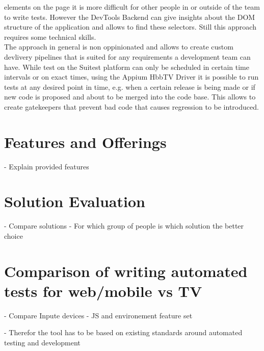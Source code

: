elements on the page it is more difficult for other people in or outside of the team to write tests. However the
DevTools Backend can give insights about the DOM structure of the application and allows to find these selectors.
Still this approach requires some technical skills.\\
The approach in general is non oppinionated and allows to create custom devlivery pipelines that is suited for any
requirements a development team can have. While test on the Suitest platform can only be scheduled in certain time
intervals or on exact times, using the Appium HbbTV Driver it is possible to run tests at any desired point in time,
e.g. when a certain release is being made or if new code is proposed and about to be merged into the code base. This
allows to create gatekeepers that prevent bad code that causes regression to be introduced.

\section{Features and Offerings\label{sec:features}}

- Explain provided features

\section{Solution Evaluation\label{sec:usab}}

- Compare solutions
- For which group of people is which solution the better choice

\section{Comparison of writing automated tests for web/mobile vs TV\label{sec:diffInWritingTests}}

- Compare Inpute devices
- JS and environement feature set


- Therefor the tool has to be based on existing standards around automated testing and development
